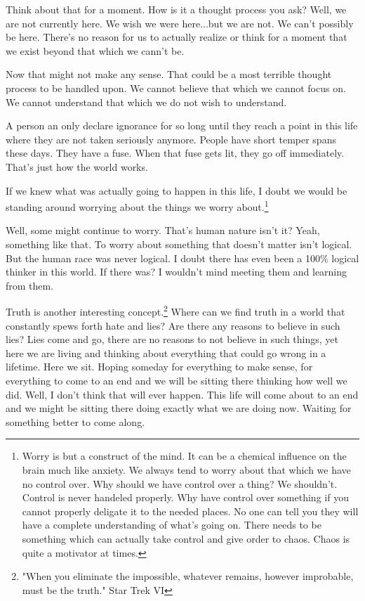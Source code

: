 {Think about that for a moment. How is it a thought process you ask? Well, we are
not currently here. We wish we were here...but we are not. We can't possibly be
here. There's no reason for us to actually realize or think for a moment that we
exist beyond that which we cann't be.

Now that might not make any sense. That could be a most terrible thought process
to be handled upon. We cannot believe that which we cannot focus on. We cannot
understand that which we do not wish to understand.

A person an only declare ignorance for so long until they reach a point in this
life where they are not taken seriously anymore. People have short temper spans
these days. They have a fuse. When that fuse gets lit, they go off immediately.
That's just how the world works.
}

If we knew what was actually going to happen in this life, I doubt we would be
standing around worrying about the things we worry about.\footnote{
Worry is but a construct of the mind. It can be a chemical influence on the
brain much like anxiety. We always tend to worry about that which we have no
control over. Why should we have control over a thing? We shouldn't. Control is
never handeled properly. Why have control over something if you cannot properly
deligate it to the needed places. No one can tell you they will have a complete
understanding of what's going on. There needs to be something which can actually
take control and give order to chaos. Chaos is quite a motivator at times.
}

Well, some might continue to worry. That's human nature isn't it? Yeah, something 
like that. To worry about something that doesn't matter isn't logical. But the 
human race was never logical. I doubt there has even been a 100\% logical 
thinker in this world. If there was? I wouldn't mind meeting them and learning 
from them.

Truth is another interesting concept.\footnote{"When you eliminate the impossible, 
whatever remains, however improbable, must be the truth." Star Trek VI} Where
can we find truth in a world that constantly spews forth hate and lies? Are
there any reasons to believe in such lies? Lies come and go, there are no
reasons to not believe in such things, yet here we are living and thinking about
everything that could go wrong in a lifetime. Here we sit. Hoping someday for
everything to make sense, for everything to come to an end and we will be
sitting there thinking how well we did. Well, I don't think that will ever
happen. This life will come about to an end and we might be sitting there doing
exactly what we are doing now. Waiting for something better to come along.
